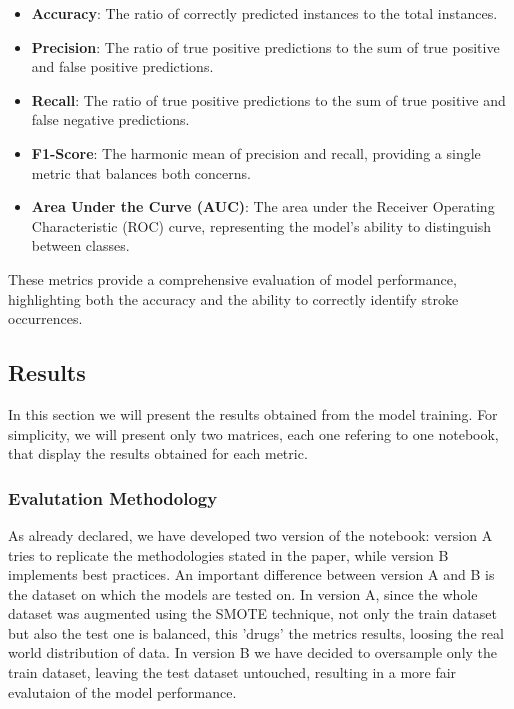\documentclass{Configuration_Files/Template}
\begin{document}
\begin{itemize}
    \item \textbf{Accuracy}: The ratio of correctly predicted instances to the total instances.
    \item \textbf{Precision}: The ratio of true positive predictions to the sum of true positive and false positive predictions.
    \item \textbf{Recall}: The ratio of true positive predictions to the sum of true positive and false negative predictions.
    \item \textbf{F1-Score}: The harmonic mean of precision and recall, providing a single metric that balances both concerns.
    \item \textbf{Area Under the Curve (AUC)}: The area under the Receiver Operating Characteristic (ROC) curve, representing the model's ability to distinguish between classes.
\end{itemize}

These metrics provide a comprehensive evaluation of model performance, highlighting both the accuracy and the ability to correctly identify stroke occurrences.

\subsection{Results}

In this section we will present the results obtained from the model training. For simplicity, we will present only two matrices, each one refering to one notebook, that display the results obtained for each metric.

\subsubsection{Evalutation Methodology}

As already declared, we have developed two version of the notebook: version A tries to replicate the methodologies stated in the paper, while version B implements best practices. An important difference between version A and B is the dataset on which the models are tested on. In version A, since the whole dataset was augmented using the SMOTE technique, not only the train dataset but also the test one is balanced, this 'drugs' the metrics results, loosing the real world distribution of data. In version B we have decided to oversample only the train dataset, leaving the test dataset untouched, resulting in a more fair evalutaion of the model performance.
\end{document}
